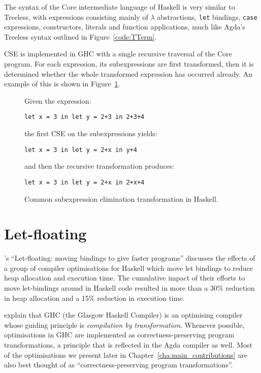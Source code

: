 The syntax of the Core intermediate language of Haskell is very similar to Treeless, with expressions consisting mainly of $\lambda$ abstractions, \lstinline{let} bindings, \lstinline{case} expressions, constructors, literals and function applications, much like Agda's Treeless syntax outlined in Figure~\ref{code:TTerm}.

CSE is implemented in GHC with a single recursive traversal of the Core program. For each expression, its subexpressions are first transformed, then it is determined whether the whole transformed expression has occurred already.\citep{Chitil-1998} An example of this is shown in Figure~\ref{code:cse_haskell}.

\begin{figure}[h]
Given the expression:

\lstinline{let x = 3 in let y = 2+3 in 2+3+4}

the first CSE on the subexpressions yields:

\lstinline{let x = 3 in let y = 2+x in y+4}

and then the recursive transformation produces:

\lstinline{let x = 3 in let y = 2+x in 2+x+4}

\caption{Common subexpression elimination transformation in Haskell.\citep{Chitil-1998}}
\label{code:cse_haskell}
\end{figure}

\section{Let-floating}
\label{sec:let_floating}

\citet{jones1996}'s ``Let-floating: moving bindings to give faster programs'' discusses the effects of a group of compiler optimisations for Haskell which move let bindings to reduce heap allocation and execution time. The cumulative impact of their efforts to move let-bindings around in Haskell code resulted in more than a 30\% reduction in heap allocation and a 15\% reduction in execution time.

\citet{jones1996} explain that GHC (the Glasgow Haskell Compiler) is an optimising compiler whose guiding principle is \textit{compilation by transformation}. Whenever possible, optimisations in GHC are implemented as correctness-preserving program transformations, a principle that is reflected in the Agda compiler as well. Most of the optimisations we present later in Chapter~\ref{cha:main_contributions} are also best thought of as ``correctness-preserving program transformations''.

